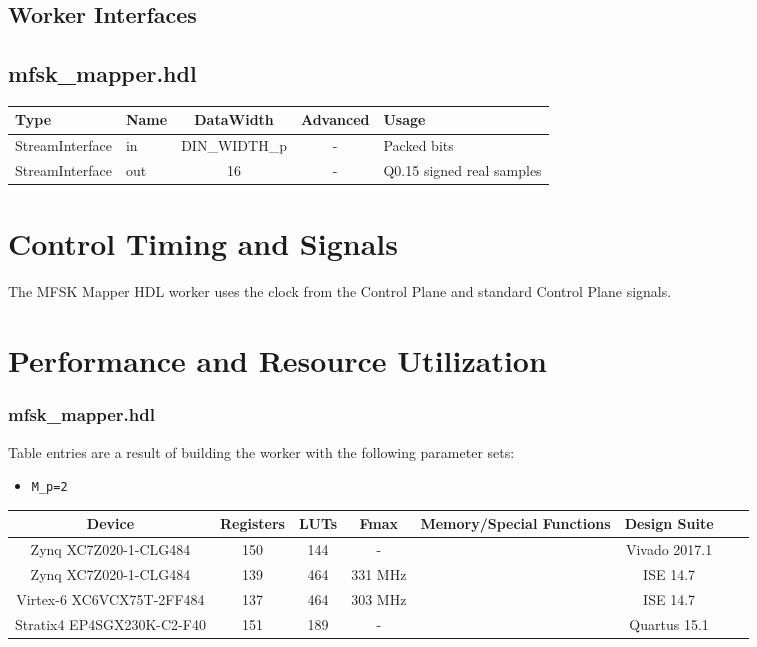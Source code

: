 \documentclass{article}
\def\comp{mfsk\_mapper}
\def\Comp{MFSK Mapper}
\begin{document}
\begin{landscape}
	\section*{Worker Interfaces}
	\subsection*{\comp.hdl}
	\begin{scriptsize}
		\begin{tabular}{|M{2cm}|M{1.5cm}|c|c|p{12cm}|}
			\hline
			Type            & Name & DataWidth 		& Advanced  & Usage                 		\\
			\hline
			StreamInterface & in   & DIN\_WIDTH\_p	& - 		& Packed bits					\\
			\hline
			StreamInterface & out  & 16        		& -			& Q0.15 signed real samples 	\\
			\hline
		\end{tabular}
	\end{scriptsize}
\end{landscape}

\section*{Control Timing and Signals}
\begin{flushleft}
	The \Comp{} HDL worker uses the clock from the Control Plane and standard Control Plane signals.\\
\end{flushleft}

\section*{Performance and Resource Utilization}
\subsubsection*{\comp.hdl}
Table entries are a result of building the worker with the following parameter sets:\
\begin{itemize}
  \item \verb+M_p=2+
\end{itemize}
\begin{scriptsize}
	\begin{tabular}{|c|c|c|c|c|c|c|c|}
    \hline
    \rowcolor{blue}
    Device                    	& Registers & LUTs & Fmax    	& Memory/Special Functions 	& Design Suite \\
    \hline
	Zynq XC7Z020-1-CLG484     	& 150       & 144  & -			& 							& Vivado 2017.1\\
	\hline
	Zynq XC7Z020-1-CLG484     	& 139       & 464  & 331 MHz  	& 							& ISE 14.7     \\
	\hline
	Virtex-6 XC6VCX75T-2FF484 	& 137       & 464  & 303 MHz  	&  							& ISE 14.7     \\
	\hline
	Stratix4 EP4SGX230K-C2-F40 	& 151       & 189  & -			& 							& Quartus 15.1 \\
	\hline
	\end{tabular}
\end{scriptsize}
\end{document}
